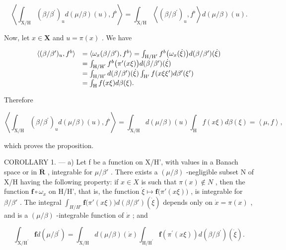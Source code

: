 \[
\left\langle \int_ {\mathrm{X} / \mathrm{H}} \left(\beta / \beta^ {\prime}\right) _ {u} d (\mu / \beta) (u), f ^ {\flat} \right\rangle = \int_ {\mathrm{X} / \mathrm{H}} \left\langle \left(\beta / \beta^ {\prime}\right) _ {u}, f ^ {\flat} \right\rangle d (\mu / \beta) (u).
\]

Now, let \(x \in \mathbf{X}\) and \(u = \pi(x)\) . We have

\[
\begin{array}{r l} \langle (\beta / \beta^ {\prime}) _ {u}, f ^ {b} \rangle & = \langle \omega_ {x} (\beta / \beta^ {\prime}), f ^ {b} \rangle = \int_ {\mathrm{H/H} ^ {\prime}} f ^ {b} \big (\omega_ {x} (\dot {\xi}) \big) d (\beta / \beta^ {\prime}) (\dot {\xi}) \\ & = \int_ {\mathrm{H/H} ^ {\prime}} f ^ {b} \big (\pi^ {\prime} (x \xi) \big) d (\beta / \beta^ {\prime}) (\dot {\xi}) \\ & = \int_ {\mathrm{H/H} ^ {\prime}} d (\beta / \beta^ {\prime}) (\dot {\xi}) \int_ {\mathrm{H} ^ {\prime}} f (x \xi \xi^ {\prime}) d \beta^ {\prime} (\xi^ {\prime}) \\ & = \int_ {\mathrm{H}} f (x \xi) d \beta (\xi). \end{array}
\]

Therefore

\[
\left\langle \int_ {\mathrm{X/H}} (\beta / \beta^ {\prime}) _ {u} d (\mu / \beta) (u), f ^ {\flat} \right\rangle = \int_ {\mathrm{X/H}} d (\mu / \beta) (u) \int_ {\mathrm{H}} f (x \xi) d \beta (\xi) = \left\langle \mu , f \right\rangle ,
\]

which proves the proposition.

COROLLARY 1. --- a) Let f be a function on X/H', with values in a Banach space or in \(\overline{\mathbf{R}}\) , integrable for \(\mu/\beta'\) . There exists a \((\mu/\beta)\) -negligible subset N of X/H having the following property: if \(x \in X\) is such that \(\pi(x) \notin N\) , then the function \(\mathbf{f} \circ \omega_x\) on H/H', that is, the function \(\dot{\xi} \mapsto \mathbf{f}\big(\pi'(x\xi)\big)\) , is integrable for \(\beta/\beta'\) . The integral \(\int_{H/H'} \mathbf{f}\big(\pi'(x\xi)\big)d(\beta/\beta')(\dot{\xi})\) depends only on \(\dot{x} = \pi(x)\) , and is a \((\mu/\beta)\) -integrable function of \(\dot{x}\) ; and

\[
\int_ {\mathrm{X} / \mathrm{H} ^ {\prime}} \mathbf {f} d (\mu / \beta^ {\prime}) = \int_ {\mathrm{X} / \mathrm{H}} d (\mu / \beta) (\dot {x}) \int_ {\mathrm{H} / \mathrm{H} ^ {\prime}} \mathbf {f} \left(\pi^ {\prime} (x \xi)\right) d (\beta / \beta^ {\prime}) (\dot {\xi}).
\]

